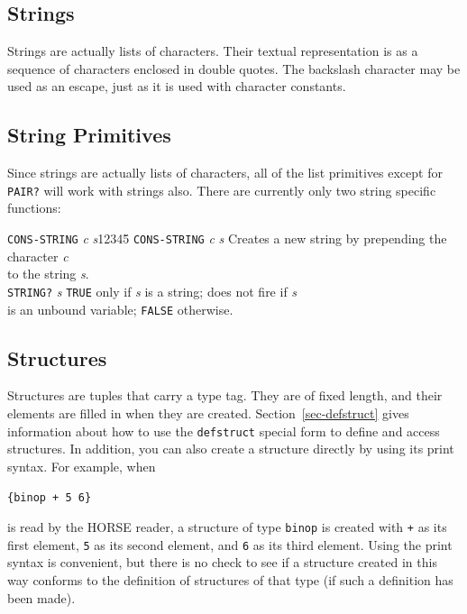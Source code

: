 \subsection{Strings}

	Strings are actually lists of characters.  Their textual
representation is as a sequence of characters enclosed in double quotes.
The backslash character may be used as an escape, just as it is used with
character constants.


\subsection{String Primitives}

	Since strings are actually lists of characters, all of the list
primitives except for {\tt PAIR?} will work with strings also.  There
are currently only two string specific functions:  
\begin{tabbing}
{\tt CONS-STRING} {\sl c} {\sl s}12345\=\kill
{\tt CONS-STRING} {\sl c} {\sl s} \> Creates a new string by prepending
the character {\sl c} \\ \>to the string {\sl s}.\\
{\tt STRING?} {\sl s} \> {\tt TRUE} only if {\sl s} is a string;
does not fire if {\sl s} \\ \> is an unbound variable; {\tt FALSE} otherwise.
\end{tabbing}


\subsection{Structures}

	Structures are tuples that carry a type tag.  They are of fixed
length, and their elements are filled in when they are created.  
Section~\ref{sec-defstruct} gives information about how to use
the {\tt defstruct} special form to define and access structures.
In addition, you can also
create a structure directly by using its print syntax.  For example, when
\begin{center}
	{\tt \{binop + 5 6\}}
\end{center}
is read by the HORSE reader, a structure of type {\tt binop} is created
with {\tt +} as its first element, {\tt 5} as its second element, and
{\tt 6} as its third element.  Using the print syntax is convenient, but
there is no check to see if a structure created in this way conforms to
the definition of structures of that type (if such a definition has
been made).


